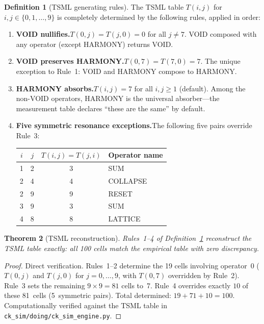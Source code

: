 \documentclass[11pt]{article}
\newtheorem{theorem}{Theorem}[section]
\theoremstyle{definition}
\newtheorem{definition}[theorem]{Definition}
\theoremstyle{remark}
\begin{document}
\begin{definition}[TSML generating rules]
\label{def:tsml-rules}
The TSML table $T(i,j)$ for $i,j \in \{0,1,\dots,9\}$ is completely determined
by the following rules, applied in order:

\begin{enumerate}[label=\textbf{Rule \arabic*:}, leftmargin=3.5em]
  \item \textbf{VOID nullifies.}\quad $T(0,j) = T(j,0) = 0$ for all $j \neq 7$.
        VOID composed with any operator (except HARMONY) returns VOID.
  \item \textbf{VOID preserves HARMONY.}\quad $T(0,7) = T(7,0) = 7$.
        The unique exception to Rule~1: VOID and HARMONY compose to HARMONY.
  \item \textbf{HARMONY absorbs.}\quad $T(i,j) = 7$ for all $i,j \ge 1$
        (default).  Among the non-VOID operators, HARMONY is the universal
        absorber---the measurement table declares ``these are the same'' by
        default.
  \item \textbf{Five symmetric resonance exceptions.}\quad The following
        five pairs override Rule~3:
        \begin{center}
        \begin{tabular}{cccl}
        \toprule
        $i$ & $j$ & $T(i,j) = T(j,i)$ & \textbf{Operator name} \\
        \midrule
        1 & 2 & 3 & SUM \\
        2 & 4 & 4 & COLLAPSE \\
        2 & 9 & 9 & RESET \\
        3 & 9 & 3 & SUM \\
        4 & 8 & 8 & LATTICE \\
        \bottomrule
        \end{tabular}
        \end{center}
\end{enumerate}
\end{definition}

\begin{theorem}[TSML reconstruction]
\label{thm:tsml-reconstruction}
Rules~1--4 of Definition~\ref{def:tsml-rules} reconstruct the TSML table
exactly: all 100 cells match the empirical table with zero discrepancy.
\end{theorem}

\begin{proof}
Direct verification.  Rules~1--2 determine the 19 cells involving operator~0
($T(0,j)$ and $T(j,0)$ for $j = 0,\dots,9$, with $T(0,7)$ overridden by
Rule~2).  Rule~3 sets the remaining $9 \times 9 = 81$ cells to~7.
Rule~4 overrides exactly $10$ of these 81~cells (5~symmetric pairs).
Total determined: $19 + 71 + 10 = 100$.  Computationally verified against the
TSML table in \texttt{ck\_sim/doing/ck\_sim\_engine.py}.
\end{proof}
\end{document}
